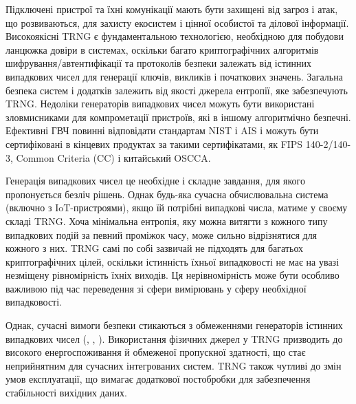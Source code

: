 Підключені пристрої та їхні комунікації мають бути захищені від загроз і атак, що розвиваються, для захисту екосистем і цінної особистої та ділової інформації. Високоякісні TRNG є фундаментальною технологією, необхідною для побудови ланцюжка довіри в системах, оскільки багато криптографічних алгоритмів шифрування/автентифікації та протоколів безпеки залежать від істинних випадкових чисел для генерації ключів, викликів і початкових значень. Загальна безпека систем і додатків залежить від якості джерела ентропії, яке забезпечують TRNG. Недоліки генераторів випадкових чисел можуть бути використані зловмисниками для компрометації пристроїв, які в іншому алгоритмічно безпечні. Ефективні ГВЧ повинні відповідати стандартам NIST і AIS і можуть бути сертифіковані в кінцевих продуктах за такими сертифікатами, як FIPS 140-2/140-3, Common Criteria (CC) і китайський OSCCA.


Генерація випадкових чисел це необхідне і складне завдання, для якого пропонується безліч рішень. Однак будь-яка сучасна обчислювальна система (включно з IoT-пристроями), якщо їй потрібні випадкові числа, матиме у своєму складі TRNG. Хоча мінімальна ентропія, яку можна витягти з кожного типу випадкових подій за певний проміжок часу, може сильно відрізнятися для кожного з них. TRNG самі по собі зазвичай не підходять для багатьох криптографічних цілей, оскільки істинність їхньої випадковості не має на увазі незміщену рівномірність їхніх виходів. Ця нерівномірність може бути особливо важливою під час переведення зі сфери вимірювань у сферу необхідної випадковості.


Однак, сучасні вимоги безпеки стикаються з обмеженнями генераторів істинних випадкових чисел (\cite{cryptoSEQuestion}, \cite{goubin2000true}, \cite{chmielewski2007true}). Використання фізичних джерел у TRNG призводить до високого енергоспоживання й обмеженої пропускної здатності, що стає неприйнятним для сучасних інтегрованих систем. TRNG також чутливі до змін умов експлуатації, що вимагає додаткової постобробки для забезпечення стабільності вихідних даних.


